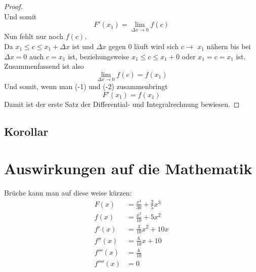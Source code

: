 \documentclass[fontsize=12pt,paper=a4,DIV12,cleardoublepage=empty, 
liststotoc,idxtotoc,bibtotoc]{article}
\theoremstyle{plain}
\theoremstyle{definition}
\begin{document}
\begin{proof}
\begin{equation}
		\end{equation}
		Und somit
		\begin{equation}
			F'(x_1)=\lim \limits_{\Delta x \to 0}f(c)
		\end{equation}
		Nun fehlt nur noch $f(c)$.\\ Da $x_1 \leq c \leq x_1+\Delta x$ ist und $\Delta x$ gegen $0$ läuft wird sich $c\to$ $x_1$ nähern bis bei $\Delta x=0$ auch $c = x_1$ ist, beziehungsweise $x_1 \leq c \leq x_1 + 0$ oder $x_1 = c = x_1$ ist.\\Zusammenfassend ist also
		\begin{equation}
			\lim \limits_{\Delta x \to 0} f(c) = f(x_1)
		\end{equation}
		Und somit, wenn man (-1) und (-2) zusammenbringt
		\begin{equation}
			F'(x_1)=f(x_1)
		\end{equation}
		Damit ist der erste Satz der Differential- und Integralrechnung bewiesen.
	\end{proof}
	
	\subsection{Korollar}
		
	
	\section{Auswirkungen auf die Mathematik}
	Brüche kann man auf diese weise kürzen:
		\begin{equation}
			\begin{aligned}
				F(x)&=\frac{{x}^{4}}{30}+\frac{2}{5}{x}^{3}\\
				f(x)&=\frac{{x}^{3}}{10}+5{x}^{2}\\
				f'(x)&=\frac{3}{10}{x}^{2}+10x\\
				f''(x)&=\frac{6}{10}x+10\\
				f'''(x)&=\frac{6}{10}\\
				f''''(x)&=0\\
			\end{aligned}
		\end{equation}
\end{document}
